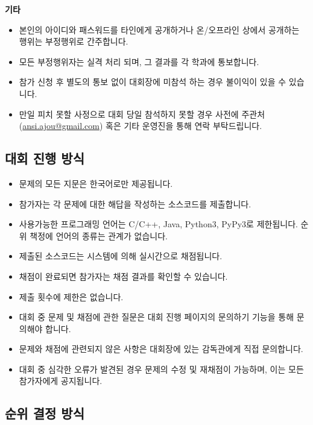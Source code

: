 \begin{spacing}{1.15}
\textbf{기타}

\begin{itemize}
    \item 본인의 아이디와 패스워드를 타인에게 공개하거나 온/오프라인 상에서 공개하는 행위는 부정행위로 간주합니다.
    \item 모든 부정행위자는 실격 처리 되며, 그 결과를 각 학과에 통보합니다.
    \item 참가 신청 후 별도의 통보 없이 대회장에 미참석 하는 경우 불이익이 있을 수 있습니다.
    \item 만일 피치 못할 사정으로 대회 당일 참석하지 못할 경우 사전에 주관처(\href{mailto: ansi.ajou@gmail.com}{ansi.ajou@gmail.com}) 혹은 기타 운영진을 통해 연락 부탁드립니다.
\end{itemize}

\subsection*{대회 진행 방식}

\begin{itemize}
    \item 문제의 모든 지문은 한국어로만 제공됩니다.
    \item 참가자는 각 문제에 대한 해답을 작성하는 소스코드를 제출합니다.
    \item 사용가능한 프로그래밍 언어는 C/C++, Java, Python3, PyPy3로 제한됩니다. 순위 책정에 언어의 종류는 관계가 없습니다. 
    \item 제출된 소스코드는 시스템에 의해 실시간으로 채점됩니다.
    \item 채점이 완료되면 참가자는 채점 결과를 확인할 수 있습니다.
    \item 제출 횟수에 제한은 없습니다.
    \item 대회 중 문제 및 채점에 관한 질문은 대회 진행 페이지의 문의하기 기능을 통해 문의해야 합니다.
    \item 문제와 채점에 관련되지 않은 사항은 대회장에 있는 감독관에게 직접 문의합니다.
    \item 대회 중 심각한 오류가 발견된 경우 문제의 수정 및 재채점이 가능하며, 이는 모든 참가자에게 공지됩니다.
\end{itemize}

\subsection*{순위 결정 방식}


\end{spacing}
